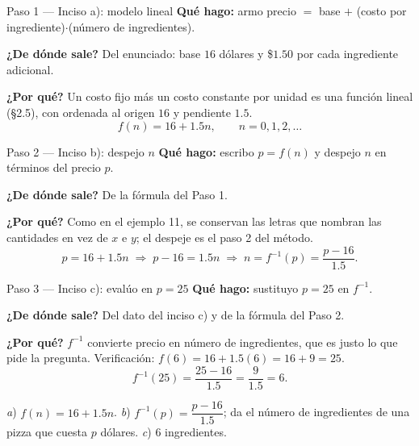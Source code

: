 \documentclass[11pt]{article}
\begin{document}
\begin{paso}{Paso 1 --- Inciso a): modelo lineal}
\textbf{Qué hago:} armo precio $=$ base $+$ (costo por ingrediente)$\cdot$(número de ingredientes).

\textbf{¿De dónde sale?} Del enunciado: base $16$ dólares y \$$1.50$ por cada ingrediente adicional.

\textbf{¿Por qué?} Un costo fijo más un costo constante por unidad es una función lineal (§2.5), con ordenada al origen $16$ y pendiente $1.5$.
\[
f(n)=16+1.5n, \qquad n=0,1,2,\dots
\]
\end{paso}

\begin{paso}{Paso 2 --- Inciso b): despejo $n$}
\textbf{Qué hago:} escribo $p=f(n)$ y despejo $n$ en términos del precio $p$.

\textbf{¿De dónde sale?} De la fórmula del Paso 1.

\textbf{¿Por qué?} Como en el ejemplo 11, se conservan las letras que nombran las cantidades en vez de $x$ e $y$; el despeje es el paso 2 del método.
\[
p=16+1.5n \;\Longrightarrow\; p-16=1.5n \;\Longrightarrow\; n=f^{-1}(p)=\frac{p-16}{1.5}.
\]
\end{paso}

\begin{paso}{Paso 3 --- Inciso c): evalúo en $p=25$}
\textbf{Qué hago:} sustituyo $p=25$ en $f^{-1}$.

\textbf{¿De dónde sale?} Del dato del inciso c) y de la fórmula del Paso 2.

\textbf{¿Por qué?} $f^{-1}$ convierte precio en número de ingredientes, que es justo lo que pide la pregunta. Verificación: $f(6)=16+1.5(6)=16+9=25$.
\[
f^{-1}(25)=\frac{25-16}{1.5}=\frac{9}{1.5}=6.
\]
\end{paso}

\begin{resp}
\textit{a}) $f(n)=16+1.5n$. \quad
\textit{b}) $f^{-1}(p)=\dfrac{p-16}{1.5}$; da el número de ingredientes de una pizza que cuesta $p$ dólares. \quad
\textit{c}) $6$ ingredientes.
\end{resp}
\end{document}
